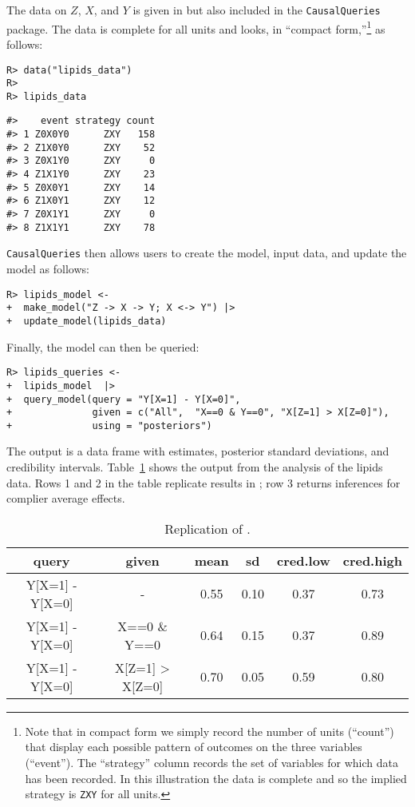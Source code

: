 \documentclass[
  11pt,
  article]{jss}
\begin{document}
The data on \(Z\), \(X\), and \(Y\) is given in
\citet{chickering_clinicians_1996} but also included in the
\texttt{CausalQueries} package. The data is complete for all units and
looks, in ``compact form,''\footnote{Note that in compact form we simply
  record the number of units (``count'') that display each possible
  pattern of outcomes on the three variables (``event''). The
  ``strategy'' column records the set of variables for which data has
  been recorded. In this illustration the data is complete and so the
  implied strategy is \texttt{ZXY} for all units.} as follows:

\begin{verbatim}
R> data("lipids_data")
R> 
R> lipids_data
\end{verbatim}

\begin{verbatim}
#>    event strategy count
#> 1 Z0X0Y0      ZXY   158
#> 2 Z1X0Y0      ZXY    52
#> 3 Z0X1Y0      ZXY     0
#> 4 Z1X1Y0      ZXY    23
#> 5 Z0X0Y1      ZXY    14
#> 6 Z1X0Y1      ZXY    12
#> 7 Z0X1Y1      ZXY     0
#> 8 Z1X1Y1      ZXY    78
\end{verbatim}

\texttt{CausalQueries} then allows users to create the model, input
data, and update the model as follows:

\begin{verbatim}
R> lipids_model <-  
+  make_model("Z -> X -> Y; X <-> Y") |>
+  update_model(lipids_data)
\end{verbatim}

Finally, the model can then be queried:

\begin{verbatim}
R> lipids_queries <- 
+  lipids_model  |>
+  query_model(query = "Y[X=1] - Y[X=0]",
+              given = c("All",  "X==0 & Y==0", "X[Z=1] > X[Z=0]"),
+              using = "posteriors") 
\end{verbatim}

The output is a data frame with estimates, posterior standard
deviations, and credibility intervals. Table~\ref{tbl-lipids} shows the
output from the analysis of the lipids data. Rows 1 and 2 in the table
replicate results in \citet{chickering_clinicians_1996}; row 3 returns
inferences for complier average effects.

\hypertarget{tbl-lipids}{}
\begin{longtable}[t]{cccccc}
\caption{\label{tbl-lipids}Replication of \citet{chickering_clinicians_1996}. }\tabularnewline

\toprule
query & given & mean & sd & cred.low & cred.high\\
\midrule
Y[X=1] - Y[X=0] & - & 0.55 & 0.10 & 0.37 & 0.73\\
Y[X=1] - Y[X=0] & X==0 \& Y==0 & 0.64 & 0.15 & 0.37 & 0.89\\
Y[X=1] - Y[X=0] & X[Z=1] > X[Z=0] & 0.70 & 0.05 & 0.59 & 0.80\\
\bottomrule
\end{longtable}
\end{document}
